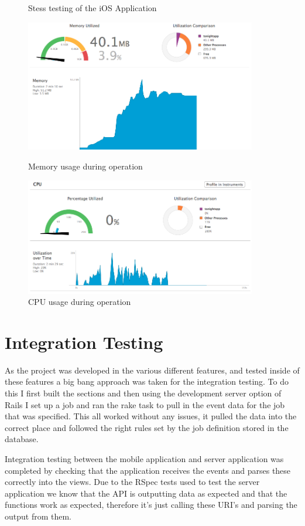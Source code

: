 	\begin{figure}[H]
		\centering
		\caption{Stess testing of the iOS Application}
		\begin{minipage}{.5\linewidth}
			\includegraphics[width=0.9\textwidth]{Images/iosMem}
			\caption{Memory usage during operation}
			\label{fig:iosMem}
		\end{minipage}%
		\begin{minipage}{.5\linewidth}
			\includegraphics[width=0.9\textwidth]{Images/iosCPU}
			\caption{CPU usage during operation}
			\label{fig:iosCPU}
		\end{minipage}
		\label{fig:iosResources}
	\end{figure}

\section{Integration Testing}
	As the project was developed in the various different features, and tested inside of these features a big bang approach was taken for the integration testing. To do this I first built the sections and then using the development server option of Rails I set up a job and ran the rake task to pull in the event data for the job that was specified. This all worked without any issues, it pulled the data into the correct place and followed the right rules set by the job definition stored in the database. 

	Integration testing between the mobile application and server application was completed by checking that the application receives the events and parses these correctly into the views. Due to the RSpec tests used to test the server application we know that the API is outputting data as expected and that the functions work as expected, therefore it's just calling these URI's and parsing the output from them. 